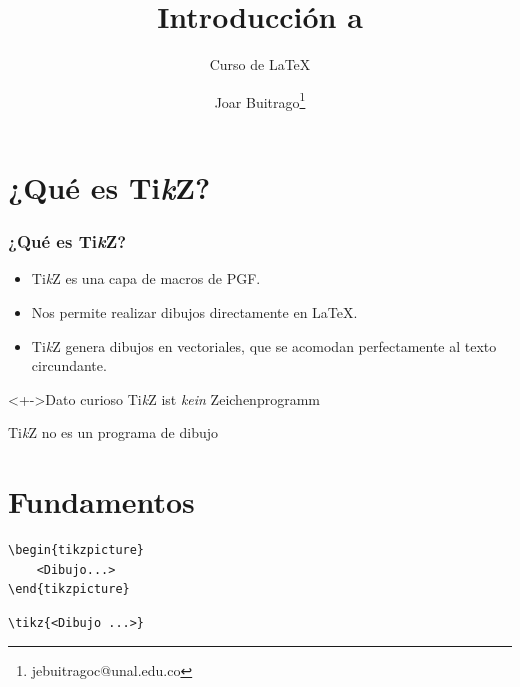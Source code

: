 \documentclass[12pt,aspectratio=169,ignorenonframetext]{ltxbeamer}
\title{Introducción a {\lmr\TikZ}}
\subtitle{Curso de {\lmr\LaTeX}}
\author{Joar Buitrago\texorpdfstring{\thanks{jebuitragoc@unal.edu.co}}{ <jebuitragoc@unal.edu.co>}}
\date{}
\newcommand{\TikZ}{Ti\textit{k}Z}
\begin{document}
\begin{frame}
\titlepage
\end{frame}



\section{¿Qué es {\lmr\TikZ}?}

\begin{frame}
\frametitle{¿Qué es {\lmr\TikZ}?}

\pause

\begin{itemize}[<+->]
    \item {\lmr\TikZ} es una capa de macros de {\lmr PGF}.
    \item Nos permite realizar dibujos directamente en {\lmr\LaTeX}.
    \item {\lmr\TikZ} genera dibujos en vectoriales, que se acomodan perfectamente al texto circundante.
\end{itemize}

\bigskip

\begin{block}<+->{Dato curioso}
    \lmr
    \TikZ{} ist \textit{kein} Zeichenprogramm

    \TikZ{} no es un programa de dibujo
\end{block}
\end{frame}





\section{Fundamentos}

\begin{frame}[fragile]
\begin{center}
    \resizebox{0.8\linewidth}{!}{\texttt{\usepackage{tikz}}}
\end{center}
\end{frame}


\begin{frame}[fragile]
\begin{verbatim}
\begin{tikzpicture}
    <Dibujo...>
\end{tikzpicture}
\end{verbatim}
\end{frame}

\begin{frame}[fragile]
\begin{verbatim}
\tikz{<Dibujo ...>}
\end{verbatim}
\end{frame}
\end{document}
